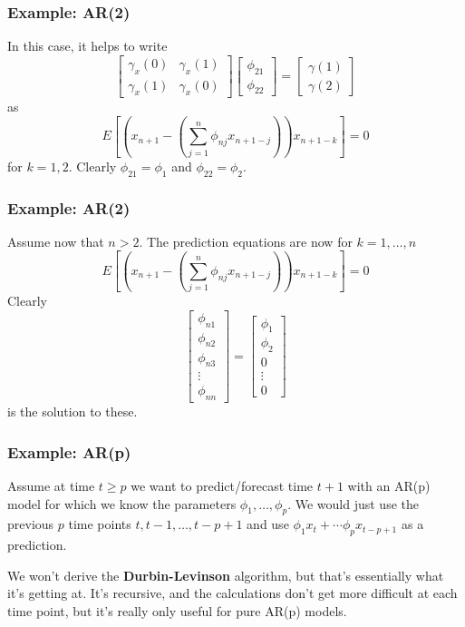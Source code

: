 \documentclass[%
xcolor=pdftex]{beamer}
\begin{document}
\begin{frame}
\frametitle{Example: AR(2)}

In this case, it helps to write 
$$
\begin{bmatrix}
\gamma_x(0) & \gamma_x(1) \\
\gamma_x(1) & \gamma_x(0)
\end{bmatrix}
\begin{bmatrix}
\phi_{21} \\
\phi_{22}
\end{bmatrix}
=
\begin{bmatrix}
\gamma(1) \\
\gamma(2)
\end{bmatrix}
$$
as
$$
E\left[ \left(x_{n+1} - \left( \sum_{j=1}^n \phi_{nj} x_{n+1-j}\right)\right)x_{n+1-k}  \right] = 0
$$
for $k=1,2$. Clearly $\phi_{21} = \phi_1$ and $\phi_{22} = \phi_2$. 
\end{frame}


\begin{frame}
\frametitle{Example: AR(2)}

Assume now that $n > 2$. The prediction equations are now for $k=1,\ldots,n$
$$
E\left[ \left(x_{n+1} - \left( \sum_{j=1}^n \phi_{nj} x_{n+1-j}\right)\right)x_{n+1-k}  \right] = 0
$$
Clearly 
$$
\begin{bmatrix}
\phi_{n1} \\
\phi_{n2} \\
\phi_{n3} \\
\vdots \\
\phi_{nn}
\end{bmatrix}
=
\begin{bmatrix}
\phi_{1} \\
\phi_{2} \\
0 \\
\vdots \\
0
\end{bmatrix}
$$ 
is the solution to these.
\end{frame}

\begin{frame}
\frametitle{Example: AR(p)}

Assume at time $t \ge p$ we want to predict/forecast time $t+1$ with an AR(p) model for which we know the parameters $\phi_1, \ldots, \phi_p$. We would just use the previous $p$ time points $t, t-1, \ldots, t-p+1$ and use $\phi_1 x_t + \cdots \phi_p x_{t-p+1}$ as a prediction.
\newline

We won't derive the {\bf Durbin-Levinson} algorithm, but that's essentially what it's getting at. It's recursive, and the calculations don't get more difficult at each time point, but it's really only useful for pure AR(p) models.

\end{frame}
\end{document}
